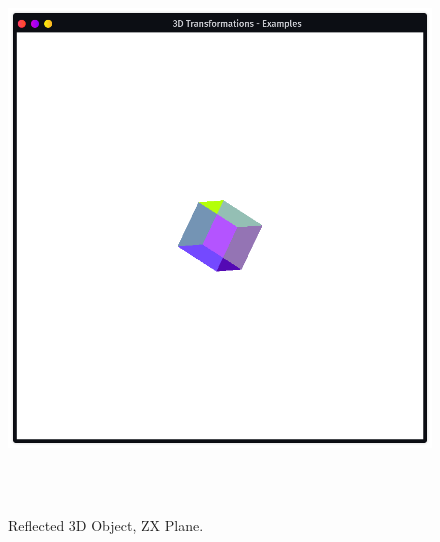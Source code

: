 \documentclass[12pt, a4]{article}
\begin{document}
\subsection*{}
\begin{figure}[h]
\centering
\caption{Reflected 3D Object, ZX Plane.}
\includegraphics[height=15cm, width=15cm]{Outputs/Output-4.png}
\end{figure}

\newpage
\end{document}
